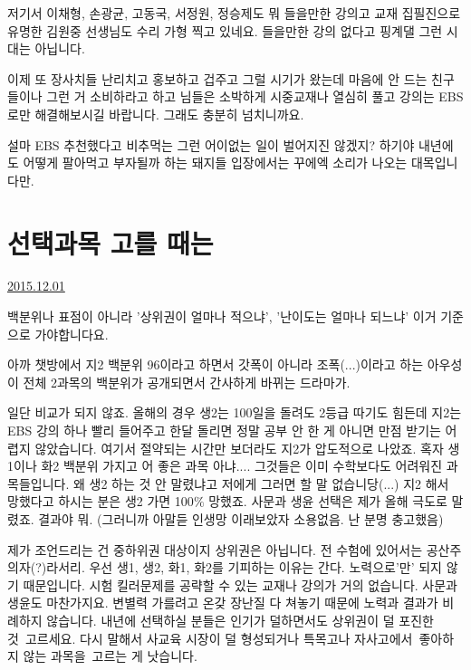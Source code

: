 저기서 이채형, 손광균, 고동국, 서정원, 정승제도 뭐 들을만한 강의고
교재 집필진으로 유명한 김원중 선생님도 수리 가형 찍고 있네요.
들을만한 강의 없다고 핑계댈 그런 시대는 아닙니다.
\vspace{5mm}

이제 또 장사치들 난리치고 홍보하고 겁주고 그럴 시기가 왔는데
마음에 안 드는 친구들이나 그런 거 소비하라고 하고
님들은 소박하게 시중교재나 열심히 풀고 강의는 EBS로만 해결해보시길 바랍니다.
그래도 충분히 넘치니까요.
\vspace{5mm}

설마 EBS 추천했다고 비추먹는 그런 어이없는 일이 벌어지진 않겠지?
하기야 내년에도 어떻게 팔아먹고 부자될까 하는 돼지들 입장에서는 꾸에엑 소리가 나오는 대목입니다만.
\vspace{5mm}






\section{선택과목 고를 때는}
\href{https://www.kockoc.com/Apoc/521445}{2015.12.01}

\vspace{5mm}

백분위나 표점이 아니라
'상위권이 얼마나 적으냐', '난이도는 얼마나 되느냐'
이거 기준으로 가야합니다요.
\vspace{5mm}

아까 챗방에서 지2 백분위 96이라고 하면서 갓폭이 아니라 조폭(...)이라고 하는 아우성이
전체 2과목의 백분위가 공개되면서 간사하게 바뀌는 드라마가.
\vspace{5mm}

일단 비교가 되지 않죠.
올해의 경우 생2는 100일을 돌려도 2등급 따기도 힘든데
지2는 EBS 강의 하나 빨리 들어주고 한달 돌리면 정말 공부 안 한 게 아니면 만점 받기는 어렵지 않았습니다.
여기서 절약되는 시간만 보더라도 지2가 압도적으로 나았죠.
혹자 생1이나 화2 백분위 가지고 어 좋은 과목 아냐.... 그것들은 이미 수학보다도 어려워진 과목들입니다.
왜 생2 하는 것 안 말렸냐고 저에게 그러면 할 말 없습니당(...)
지2 해서 망했다고 하시는 분은 생2 가면 100$\%$ 망했죠.
사문과 생윤 선택은 제가 올해 극도로 말렸죠. 결과야 뭐.
(그러니까 아말듣 인생망 이래보았자 소용없음. 난 분명 충고했음)
\vspace{5mm}

제가 조언드리는 건 중하위권 대상이지 상위권은 아닙니다. 전 수험에 있어서는 공산주의자(?)라서리.
우선 생1, 생2, 화1, 화2를 기피하는 이유는 간다. 노력으로'만' 되지 않기 때문입니다.
시험 킬러문제를 공략할 수 있는 교재나 강의가 거의 없습니다.
사문과 생윤도 마찬가지요. 변별력 가를려고 온갖 장난질 다 쳐놓기 때문에 노력과 결과가 비례하지 않습니다.
내년에 선택하실 분들은 인기가 덜하면서도 상위권이 덜 포진한 것 고르세요.
다시 말해서 사교육 시장이 덜 형성되거나 특목고나 자사고에서 좋아하지 않는 과목을 고르는 게 낫습니다.
\vspace{5mm}

